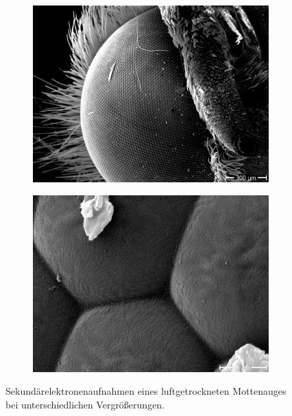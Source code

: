 \begin{figure}[!ht]
    \centering
    \begin{subfigure}{0.465\textwidth}
        \centering
        \includegraphics[width=1.1\textwidth]{img/SEM/10.9.20 9_44_08_Mag_ 70x_SE_moth_eye}
    \caption{}
    \end{subfigure}
    \hfill
    \begin{subfigure}{0.465\textwidth}
        \centering
        \includegraphics[width=1.1\textwidth]{img/SEM/10.9.20 9_46_35_Mag_ 4000x_SE_moth_eye}
        \caption{}
    \end{subfigure}
    \caption{Sekundärelektronenaufnahmen eines luftgetrockneten Mottenauges bei unterschiedlichen Vergrößerungen.}
      \label{fig:mottenauge}
\end{figure}

